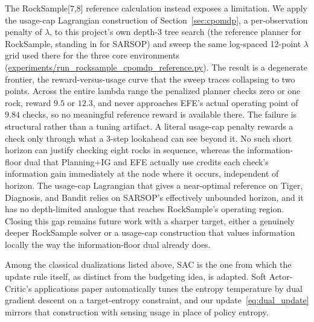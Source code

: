 The RockSample[7,8] reference calculation instead exposes a limitation. We apply the usage-cap Lagrangian construction of Section~\ref{sec:cpomdp}, a per-observation penalty of $\lambda$, to this project's own depth-3 tree search (the reference planner for RockSample, standing in for SARSOP) and sweep the same log-spaced 12-point $\lambda$ grid used there for the three core environments (\url{experiments/run_rocksample_cpomdp_reference.py}). The result is a degenerate frontier, the reward-versus-usage curve that the sweep traces collapsing to two points. Across the entire lambda range the penalized planner checks zero or one rock, reward $9.5$ or $12.3$, and never approaches EFE's actual operating point of $9.84$ checks, so no meaningful reference reward is available there. The failure is structural rather than a tuning artifact. A literal usage-cap penalty rewards a check only through what a 3-step lookahead can see beyond it. No such short horizon can justify checking eight rocks in sequence, whereas the information-floor dual that Planning+IG and EFE actually use credits each check's information gain immediately at the node where it occurs, independent of horizon. The usage-cap Lagrangian that gives a near-optimal reference on Tiger, Diagnosis, and Bandit relies on SARSOP's effectively unbounded horizon, and it has no depth-limited analogue that reaches RockSample's operating region. Closing this gap remains future work with a sharper target, either a genuinely deeper RockSample solver or a usage-cap construction that values information locally the way the information-floor dual already does.

Among the classical dualizations listed above, SAC is the one from which the update rule itself, as distinct from the budgeting idea, is adapted. Soft Actor-Critic's applications paper \citep{haarnoja2018sac} automatically tunes the entropy temperature by dual gradient descent on a target-entropy constraint, and our update~\eqref{eq:dual_update} mirrors that construction with sensing usage in place of policy entropy.

